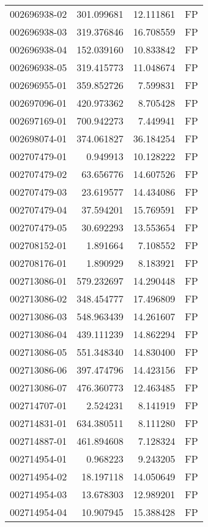 \begin{tabular}{lrrl}
002696938-02 &  301.099681 &    12.111861 &   FP \\
002696938-03 &  319.376846 &    16.708559 &   FP \\
002696938-04 &  152.039160 &    10.833842 &   FP \\
002696938-05 &  319.415773 &    11.048674 &   FP \\
002696955-01 &  359.852726 &     7.599831 &   FP \\
002697096-01 &  420.973362 &     8.705428 &   FP \\
002697169-01 &  700.942273 &     7.449941 &   FP \\
002698074-01 &  374.061827 &    36.184254 &   FP \\
002707479-01 &    0.949913 &    10.128222 &   FP \\
002707479-02 &   63.656776 &    14.607526 &   FP \\
002707479-03 &   23.619577 &    14.434086 &   FP \\
002707479-04 &   37.594201 &    15.769591 &   FP \\
002707479-05 &   30.692293 &    13.553654 &   FP \\
002708152-01 &    1.891664 &     7.108552 &   FP \\
002708176-01 &    1.890929 &     8.183921 &   FP \\
002713086-01 &  579.232697 &    14.290448 &   FP \\
002713086-02 &  348.454777 &    17.496809 &   FP \\
002713086-03 &  548.963439 &    14.261607 &   FP \\
002713086-04 &  439.111239 &    14.862294 &   FP \\
002713086-05 &  551.348340 &    14.830400 &   FP \\
002713086-06 &  397.474796 &    14.423156 &   FP \\
002713086-07 &  476.360773 &    12.463485 &   FP \\
002714707-01 &    2.524231 &     8.141919 &   FP \\
002714831-01 &  634.380511 &     8.111280 &   FP \\
002714887-01 &  461.894608 &     7.128324 &   FP \\
002714954-01 &    0.968223 &     9.243205 &   FP \\
002714954-02 &   18.197118 &    14.050649 &   FP \\
002714954-03 &   13.678303 &    12.989201 &   FP \\
002714954-04 &   10.907945 &    15.388428 &   FP \\

\end{tabular}
